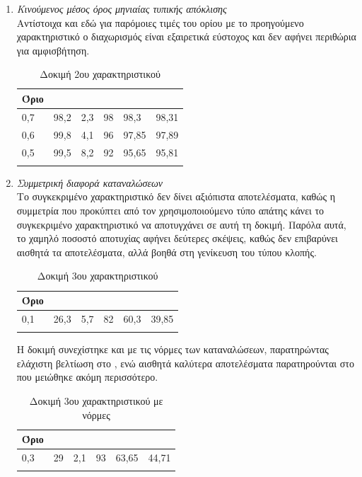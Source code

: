 \begin{enumerate}
\item{\textit{Κινούμενος μέσος όρος μηνιαίας τυπικής απόκλισης}} \\
Αντίστοιχα και εδώ για παρόμοιες τιμές του ορίου με το προηγούμενο χαρακτηριστικό ο διαχωρισμός είναι εξαιρετικά εύστοχος και δεν αφήνει περιθώρια για αμφισβήτηση.
\begin{center}
\begin{longtabu} to 0.8\textwidth { | X[c] || X[c] | X[c] | X[c] | X[c] | X[c] |  }
 \hline
  Όριο &   &  &  &  & \\
 ,7	&98,2	&2,3	&98	&98,3	&98,31\\
0,6	&99,8	&4,1	&96	&97,85	&97,89\\
0,5	&99,5	&8,2	&92	&95,65	&95,81\\
\hline
\caption{Δοκιμή 2ου χαρακτηριστικού}
\label{testfeat2}
\end{longtabu}
\end{center}
\item{\textit{Συμμετρική διαφορά καταναλώσεων}} \\
Το συγκεκριμένο χαρακτηριστικό δεν δίνει αξιόπιστα αποτελέσματα, καθώς η συμμετρία που προκύπτει από τον χρησιμοποιούμενο τύπο απάτης κάνει το συγκεκριμένο χαρακτηριστικό να αποτυγχάνει σε αυτή τη δοκιμή. Παρόλα αυτά, το χαμηλό ποσοστό αποτυχίας αφήνει δεύτερες σκέψεις, καθώς δεν επιβαρύνει αισθητά τα αποτελέσματα, αλλά βοηθά στη γενίκευση του τύπου κλοπής. 
\begin{center}
\begin{longtabu} to 0.8\textwidth { | X[c] || X[c] | X[c] | X[c] | X[c] | X[c] |  }
 \hline
  Όριο &   &  &  &  & \\
 ,1&	26,3&	5,7&	82&	60,3&	39,85\\
\hline
\caption{Δοκιμή 3ου χαρακτηριστικού}
\label{testfeat3}
\end{longtabu}
\end{center}
Η δοκιμή συνεχίστηκε και με τις νόρμες των καταναλώσεων, παρατηρώντας ελάχιστη βελτίωση στο , ενώ αισθητά καλύτερα αποτελέσματα παρατηρούνται στο  που μειώθηκε ακόμη περισσότερο.
\begin{center}
\begin{longtabu} to 0.8\textwidth { | X[c] || X[c] | X[c] | X[c] | X[c] | X[c] |  }
 \hline
  Όριο &   &  &  &  & \\
 ,3&	29&	2,1&	93&	63,65&	44,71\\
\hline
\caption{Δοκιμή 3ου χαρακτηριστικού με νόρμες}
\label{testfeat3norms}
\end{longtabu}
\end{center}


\end{enumerate}
